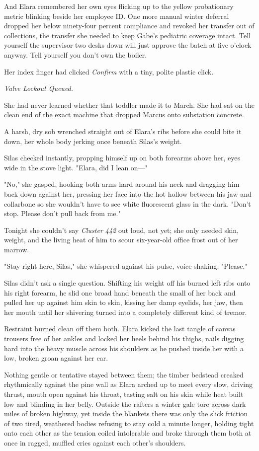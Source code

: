And Elara remembered her own eyes flicking up to the yellow probationary metric blinking beside her employee ID. One more manual winter deferral dropped her below ninety-four percent compliance and revoked her transfer out of collections, the transfer she needed to keep Gabe's pediatric coverage intact. Tell yourself the supervisor two desks down will just approve the batch at five o'clock anyway. Tell yourself you don't own the boiler.

Her index finger had clicked \textit{Confirm} with a tiny, polite plastic click.

\textit{Valve Lockout Queued.}

She had never learned whether that toddler made it to March. She had sat on the clean end of the exact machine that dropped Marcus onto substation concrete.

A harsh, dry sob wrenched straight out of Elara's ribs before she could bite it down, her whole body jerking once beneath Silas's weight.

Silas checked instantly, propping himself up on both forearms above her, eyes wide in the stove light. "Elara, did I lean on—"

"No," she gasped, hooking both arms hard around his neck and dragging him back down against her, pressing her face into the hot hollow between his jaw and collarbone so she wouldn't have to see white fluorescent glass in the dark. "Don't stop. Please don't pull back from me."

Tonight she couldn't say \textit{Cluster 442} out loud, not yet; she only needed skin, weight, and the living heat of him to scour six-year-old office frost out of her marrow.

"Stay right here, Silas," she whispered against his pulse, voice shaking. "Please."

Silas didn't ask a single question. Shifting his weight off his burned left ribs onto his right forearm, he slid one broad hand beneath the small of her back and pulled her up against him skin to skin, kissing her damp eyelids, her jaw, then her mouth until her shivering turned into a completely different kind of tremor.

Restraint burned clean off them both. Elara kicked the last tangle of canvas trousers free of her ankles and locked her heels behind his thighs, nails digging hard into the heavy muscle across his shoulders as he pushed inside her with a low, broken groan against her ear.

Nothing gentle or tentative stayed between them; the timber bedstead creaked rhythmically against the pine wall as Elara arched up to meet every slow, driving thrust, mouth open against his throat, tasting salt on his skin while heat built low and blinding in her belly. Outside the rafters a winter gale tore across dark miles of broken highway, yet inside the blankets there was only the slick friction of two tired, weathered bodies refusing to stay cold a minute longer, holding tight onto each other as the tension coiled intolerable and broke through them both at once in ragged, muffled cries against each other's shoulders.

